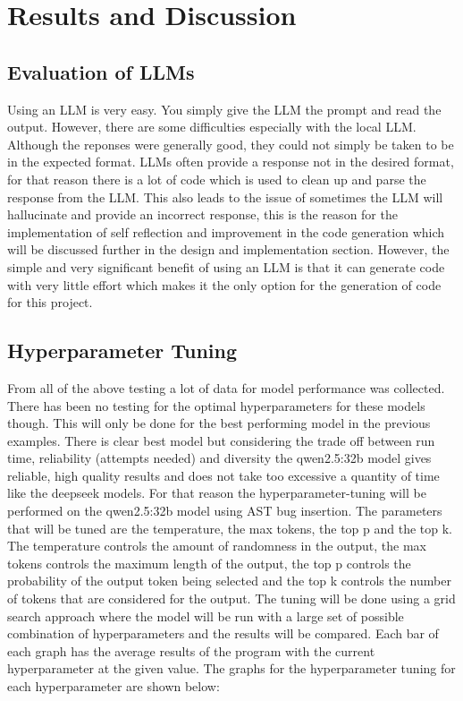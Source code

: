 \documentclass[12pt]{extarticle}
\begin{document}
\section{Results and Discussion}


\subsection{Evaluation of LLMs}

Using an LLM is very easy. You simply give the LLM the prompt and read the output. However, there are some difficulties especially with the local LLM. Although the reponses were generally good, they could not simply be taken to be in the expected format. LLMs often provide a response not in the desired format, for that reason there is a lot of code which is used to clean up and parse the response from the LLM. This also leads to the issue of sometimes the LLM will hallucinate and provide an incorrect response, this is the reason for the implementation of self reflection and improvement in the code generation which will be discussed further in the design and implementation section. However, the simple and very significant benefit of using an LLM is that it can generate code with very little effort which makes it the only option for the generation of code for this project.

\subsection{Hyperparameter Tuning}

From all of the above testing a lot of data for model performance was collected. There has been no testing for the optimal hyperparameters for these models though. This will only be done for the best performing model in the previous examples. There is clear best model but considering the trade off between run time, reliability (attempts needed) and diversity the qwen2.5:32b model gives reliable, high quality results and does not take too excessive a quantity of time like the deepseek models. For that reason the hyperparameter-tuning will be performed on the qwen2.5:32b model using AST bug insertion. The parameters that will be tuned are the temperature, the max tokens, the top p and the top k. The temperature controls the amount of randomness in the output, the max tokens controls the maximum length of the output, the top p controls the probability of the output token being selected and the top k controls the number of tokens that are considered for the output. The tuning will be done using a grid search approach where the model will be run with a large set of possible combination of hyperparameters and the results will be compared. Each bar of each graph has the average results of the program with the current hyperparameter at the given value. The graphs for the hyperparameter tuning for each hyperparameter are shown below:
\end{document}
